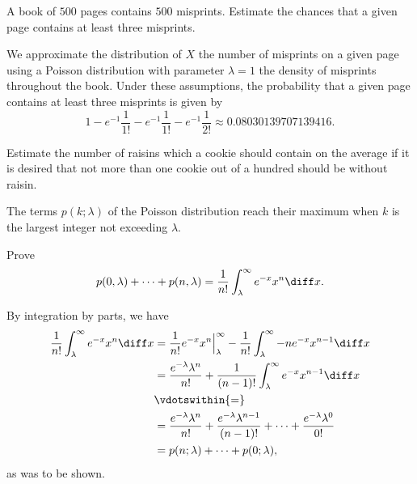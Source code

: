 \begin{problem}[Handout 10, \# 8]
  A book of \(500\) pages contains \(500\) misprints. Estimate the chances
  that a given page contains at least three misprints.
\end{problem}
\begin{solution}
  We approximate the distribution of \(X\) the number of misprints on a
  given page using a Poisson distribution with parameter \(\lambda=1\) the
  density of misprints throughout the book. Under these assumptions, the
  probability that a given page contains at least three misprints is given
  by
  \[
    1-e^{-1}\frac{1}{1!}-e^{-1}\frac{1}{1!}-e^{-1}\frac{1}{2!}
    \approx\num{0.08030139707139416}.
  \]
\end{solution}
\newpage

\begin{problem}[Handout 10, \# 9]
  Estimate the number of raisins which a cookie should contain on the
  average if it is desired that not more than one cookie out of a hundred
  should be without raisin.
\end{problem}
\begin{solution}

\end{solution}
\newpage

\begin{problem}[Handout 10, \# 10]
  The terms \(p(k;\lambda)\) of the Poisson distribution reach their
  maximum when \(k\) is the largest integer not exceeding \(\lambda\).
\end{problem}
\begin{solution}

\end{solution}
\newpage

\begin{problem}[Handout 10, \# 11]
  Prove
  \[
    p(0,\lambda)+\dotsb+p(n,\lambda)
    =\frac{1}{n!}\int_\lambda^\infty e^{-x}x^n\diff x.
  \]
\end{problem}
\begin{solution}
  By integration by parts, we have
  \begin{align*}
    \frac{1}{n!}\int_\lambda^\infty e^{-x}x^n\diff x
    &=\frac{1}{n!}e^{-x}x^n\Bigr|_\lambda^\infty-\frac{1}{n!}\int_\lambda^\infty
      -ne^{-x}x^{n-1}\diff x\\
    &=\frac{e^{-\lambda}\lambda^n}{n!}+\frac{1}{(n-1)!}\int_\lambda^\infty
      e^{-x}x^{n-1}\diff x\\
    &\vdotswithin{=}\\
    &=\frac{e^{-\lambda}\lambda^n}{n!}+\frac{e^{-\lambda}\lambda^{n-1}}{(n-1)!}+\dotsb+
      \frac{e^{-\lambda}\lambda^{0}}{0!}\\
    &=p(n;\lambda)+\dotsb+p(0;\lambda),
  \end{align*}
  as was to be shown.
\end{solution}
\newpage

